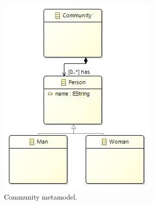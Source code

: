 \begin{figure}
\begin{subfigure}{0.5\linewidth}
                \includegraphics[width=\linewidth]{figures/communitydiagram}
                \caption{Community metamodel.}
                \label{fig:community_mm}
        \end{subfigure}%
        \caption{ }
        \label{fig:families_to_persons_metamodels}
\end{figure}


